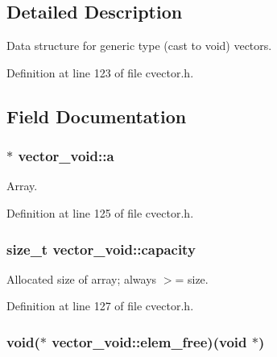\subsection{Detailed Description}
Data structure for generic type (cast to void) vectors. 

Definition at line 123 of file cvector.\-h.



\subsection{Field Documentation}
\hypertarget{structvector__void_abf49d3804780c25501484e2f916f3953}{
\subsubsection[{a}]{ $\ast$ vector\-\_\-void\-::a}}\label{structvector__void_abf49d3804780c25501484e2f916f3953}


Array. 



Definition at line 125 of file cvector.\-h.

\hypertarget{structvector__void_a440146243caeb1d285111fdd54e1006f}{
\subsubsection[{capacity}]{\setlength{\rightskip}{0pt plus 5cm}size\-\_\-t vector\-\_\-void\-::capacity}}\label{structvector__void_a440146243caeb1d285111fdd54e1006f}


Allocated size of array; always $>$= size. 



Definition at line 127 of file cvector.\-h.

\hypertarget{structvector__void_abed2ac06e76256419b825b31e879b204}{
\subsubsection[{elem\-\_\-free}]{\setlength{\rightskip}{0pt plus 5cm}void($\ast$ vector\-\_\-void\-::elem\-\_\-free)(void $\ast$)}}\label{structvector__void_abed2ac06e76256419b825b31e879b204}


